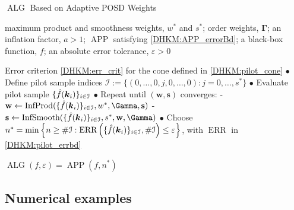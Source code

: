 \documentclass[USenglish]{article}
\theoremstyle{dgthm}
\theoremstyle{dgthm}
\theoremstyle{dgthm}
\theoremstyle{dgthm}
\theoremstyle{dgdef}
\theoremstyle{definition}
\DeclareMathOperator{\SOL}{SOL}
\DeclareMathOperator{\APP}{APP}
\DeclareMathOperator{\ALG}{ALG}
\DeclareMathOperator{\ERR}{ERR}
\newcommand{\hf}{\widehat{f}}
\newcommand{\norm}[2][{}]{\ensuremath{\left \lVert #2 \right \rVert}_{#1}}
\newcommand{\bignorm}[2][{}]{\ensuremath{\bigl \lVert #2 \bigr \rVert}_{#1}}
\newcommand{\SimonNote}[1]{{\color{purple}Simon: #1}}
\begin{document}
\begin{algorithm}
	\caption{$\ALG$ Based on Adaptive POSD Weights \label{DHKM:InfPilotConeAlg}} 
	\begin{algorithmic}
	\PARAM maximum product and smoothness weights, $w^*$ and $s^*$; order weights, $\boldsymbol{\Gamma}$; an inflation factor, $a > 1$; $\APP$ satisfying \eqref{DHKM:APP_errorBd}; 
		\INPUT a black-box function, $f$; an absolute error tolerance,
		$\varepsilon>0$

\Ensure Error criterion \eqref{DHKM:err_crit} for the cone defined in \eqref{DHKM:pilot_cone}
\State $\bullet$ Define pilot sample indices $\mathcal{I} := \{ (0, \ldots, 0, j, 0, \ldots, 0): j = 0, \ldots, s^*\}$
\State $\bullet$ Evaluate pilot sample $\{\hat{f}({\boldsymbol{k}}_i)\}_{i \in \mathcal{I}}$
\State $\bullet$ Repeat until $(\mathbf{w},\mathbf{s})$ converges:
\State \quad - $\mathbf{w} \leftarrow \text{InfProd}(\{\hat{f}(\bsk_i)\}_{i \in \mathcal{I}}, w^*, \boldsymbol{\Gamma}, \mathbf{s})$
\State \quad - $\mathbf{s} \leftarrow \text{InfSmooth}(\{\hat{f}(\bsk_i)\}_{i \in \mathcal{I}}, s^*, \mathbf{w}, \boldsymbol{\Gamma})$
\State $\bullet$ Choose $n^* =  \min \left \{n \geq \# \mathcal{I} : \text{ERR}\left( \{\hat{f}({\boldsymbol{k}}_i)\}_{i \in \mathcal{I}}, \#\mathcal{I} \right) \leq \varepsilon \right \}$, with $\ERR$ in \eqref{DHKM:pilot_errbd}

\RETURN $\ALG(f,\varepsilon) = \APP(f,n^*)$
\end{algorithmic}
\end{algorithm}


\subsection{Numerical examples}
\end{document}
